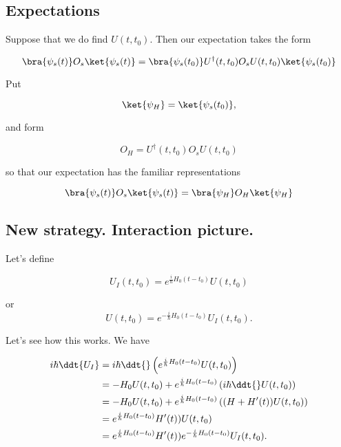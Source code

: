 \subsection{Expectations}

Suppose that we do find $U(t, t_0)$.  Then our expectation takes the form

\begin{equation}\label{eqn:qmTwoL6:600}
\bra{\psi_s(t)} O_s \ket{\psi_s(t)} 
= 
\bra{\psi_s(t_0)} U^\dagger(t, t_0) O_s U(t, t_0) \ket{\psi_s(t_0)} 
\end{equation}

Put

\begin{equation}\label{eqn:qmTwoL6:620}
\ket{\psi_H} = \ket{\psi_s(t_0)},
\end{equation}

and form

\begin{equation}\label{eqn:qmTwoL6:640}
O_H = U^\dagger(t, t_0) O_s U(t, t_0) 
\end{equation}

so that our expectation has the familiar representations

\begin{equation}\label{eqn:qmTwoL6:660}
\bra{\psi_s(t)} O_s \ket{\psi_s(t)} 
=
\bra{\psi_H} O_H \ket{\psi_H} 
\end{equation}

\subsection{New strategy.  Interaction picture.}

Let's define 

\begin{equation}\label{eqn:qmTwoL6:680}
U_I(t, t_0) = e^{\frac{i}{\hbar} H_0(t - t_0)} U(t, t_0)
\end{equation}

or
\begin{equation}\label{eqn:qmTwoL6:700}
U(t, t_0) = e^{-\frac{i}{\hbar} H_0(t - t_0)} U_I(t, t_0).
\end{equation}

Let's see how this works.  We have

\begin{align*}
i \hbar \ddt{U_I} 
&= 
i \hbar \ddt{} \left(
e^{\frac{i}{\hbar} H_0(t - t_0)} U(t, t_0)
\right) \\
&=
-H_0 U(t, t_0)
+
e^{\frac{i}{\hbar} H_0(t - t_0)} \left( i \hbar \ddt{} U(t, t_0) \right) \\
&=
-H_0 U(t, t_0)
+
e^{\frac{i}{\hbar} H_0(t - t_0)} \left( (H + H'(t)) U(t, t_0) \right) \\
&=
e^{\frac{i}{\hbar} H_0(t - t_0)} H'(t)) U(t, t_0) \\
&=
e^{\frac{i}{\hbar} H_0(t - t_0)} H'(t)) e^{-\frac{i}{\hbar} H_0(t - t_0)} U_I(t, t_0).
\end{align*}

